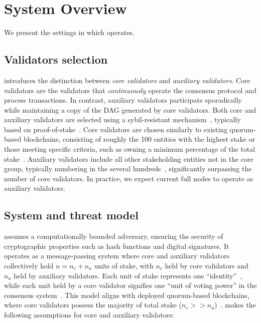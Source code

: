 \section{System Overview} \label{sec:overview}

We present the settings in which \sysname operates.

\subsection{Validators selection} \label{sec:validators}
\sysname introduces the distinction between \emph{core validators} and \emph{auxiliary validators}. Core validators are the validators that \emph{continuously} operate the consensus protocol and process transactions. In contrast, auxiliary validators participate sporadically while maintaining a copy of the DAG generated by core validators.
Both core and auxiliary validators are selected using a sybil-resistant mechanism~\cite{douceur2002sybil}, typically based on proof-of-stake~\cite{kucci2021proof}. Core validators are chosen similarly to existing quorum-based blockchains, consisting of roughly the 100 entities with the highest stake or those meeting specific criteria, such as owning a minimum percentage of the total stake~\cite{sui}.  Auxiliary validators include all other stakeholding entities not in the core group, typically numbering in the several hundreds~\cite{sui-scan}, significantly surpassing the number of core validators.  In practice, we expect current full nodes to operate as auxiliary validators.

\subsection{System and threat model} \label{sec:model}
\sysname assumes a computationally bounded adversary, ensuring the security of cryptographic properties such as hash functions and digital signatures. It operates as a message-passing system where core and auxiliary validators collectively hold  $n = n_c + n_a$ units of stake, with $n_c$ held by core validators and $n_a$ held by auxiliary validators. Each unit of stake represents one ``identity''~\cite{douceur2002sybil}, while each unit held by a core validator signifies one ``unit of voting power'' in the consensus system~\cite{sui-code,sui}. This model aligns with deployed quorum-based blockchains, where core validators possess the majority of total stake ($n_c >> n_a$)~\cite{sui,aptos,solana}. \sysname makes the following assumptions for core and auxiliary validators:

